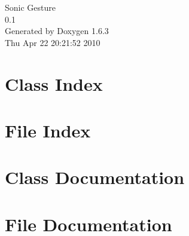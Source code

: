 \documentclass[a4paper]{book}
\begin{document}
\hypersetup{pageanchor=false}
\begin{titlepage}
\vspace*{7cm}
\begin{center}
{\Large Sonic Gesture \\[1ex]\large 0.1 }\\
\vspace*{1cm}
{\large Generated by Doxygen 1.6.3}\\
\vspace*{0.5cm}
{\small Thu Apr 22 20:21:52 2010}\\
\end{center}
\end{titlepage}
\clearemptydoublepage
{}
\tableofcontents
\clearemptydoublepage
{}
\hypersetup{pageanchor=true}
\chapter{Class Index}

\chapter{File Index}

\chapter{Class Documentation}











\chapter{File Documentation}





















\printindex
\end{document}
